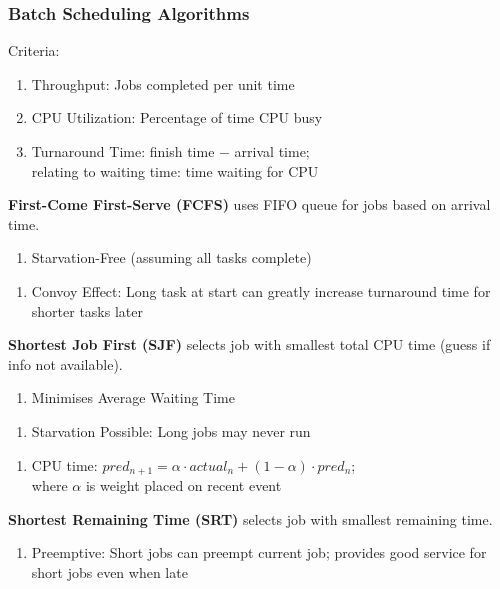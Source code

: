 \documentclass[12pt, a4paper]{article}
\begin{document}
\begin{multicols*}{3}
\subsubsection{Batch Scheduling Algorithms}
Criteria:
\begin{enumerate}[\roman*.]
  \item Throughput: Jobs completed per unit time
  \item CPU Utilization: Percentage of time CPU busy
  \item Turnaround Time: finish time $-$ arrival time;\\ relating to waiting time: time waiting for CPU
\end{enumerate}

\textbf{First-Come First-Serve (FCFS)} uses FIFO queue for jobs based on arrival time.
\begin{enumerate}[$+$]
  \item Starvation-Free (assuming all tasks complete)
\end{enumerate}\vspace{-1pt}
\begin{enumerate}[$-$]
  \item Convoy Effect: Long task at start can greatly increase turnaround time for shorter tasks later
\end{enumerate}

\textbf{Shortest Job First (SJF)} selects job with smallest total CPU time (guess if info not available).
\begin{enumerate}[$+$]
  \item Minimises Average Waiting Time
\end{enumerate}\vspace{-1pt}
\begin{enumerate}[$-$]
  \item Starvation Possible: Long jobs may never run
\end{enumerate}\vspace{-1pt}
\begin{enumerate}[\roman*.]
  \item CPU time: $pred_{n+1} = \alpha\cdot actual_{n}+(1-\alpha)\cdot pred_{n}$;\\
    where $\alpha$ is weight placed on recent event
\end{enumerate}

\textbf{Shortest Remaining Time (SRT)} selects job with smallest remaining time.
\begin{enumerate}[$+$]
  \item Preemptive: Short jobs can preempt current job; provides good service for short jobs even when late
\end{enumerate}
\colbreak

\end{multicols*}
\end{document}
